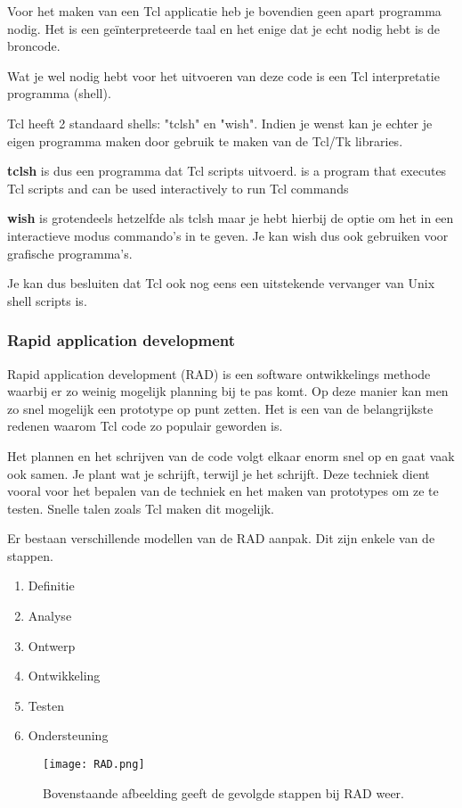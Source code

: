 \documentclass{article}
\begin{document}
\begin{flushleft}
Voor het maken van een Tcl applicatie heb je bovendien geen apart programma nodig. Het is een geïnterpreteerde taal en het enige dat je echt nodig hebt is de broncode.\medskip

Wat je wel nodig hebt voor het uitvoeren van deze code is een Tcl interpretatie programma (shell).\medskip

Tcl heeft 2 standaard shells: "tclsh" en "wish". Indien je wenst kan je echter je eigen programma maken door gebruik te maken van de Tcl/Tk libraries.\medskip

\textbf{tclsh} is dus een programma dat Tcl scripts uitvoerd. is a program that executes Tcl scripts and can be used interactively to run Tcl commands\medskip

\textbf{wish} is grotendeels hetzelfde als tclsh maar je hebt hierbij de optie om het in een interactieve modus commando's in te geven. Je kan wish dus ook gebruiken voor grafische programma's.\medskip

Je kan dus besluiten dat Tcl ook nog eens een uitstekende vervanger van Unix shell scripts is.

\subsubsection{Rapid application development}
Rapid application development (RAD) is een software ontwikkelings methode waarbij er zo weinig mogelijk planning bij te pas komt. Op deze manier kan men zo snel mogelijk een prototype op punt zetten. Het is een van de belangrijkste redenen waarom Tcl code zo populair geworden is.\medskip

Het plannen en het schrijven van de code volgt elkaar enorm snel op en gaat vaak ook samen. Je plant wat je schrijft, terwijl je het schrijft. Deze techniek dient vooral voor het bepalen van de techniek en het maken van prototypes om ze te testen. Snelle talen zoals Tcl maken dit mogelijk.\medskip

Er bestaan verschillende modellen van de RAD aanpak. Dit zijn enkele van de stappen.
\begin{enumerate}
\item Definitie
\item Analyse
\item Ontwerp
\item Ontwikkeling
\item Testen
\item Ondersteuning
\end{enumerate}

\begin{figure}[htp]
\centering
\texttt{[image: RAD.png]}
\caption{Bovenstaande afbeelding geeft de gevolgde stappen bij RAD weer.}
\label{}
\end{figure}
\newpage

\end{flushleft}
\end{document}
